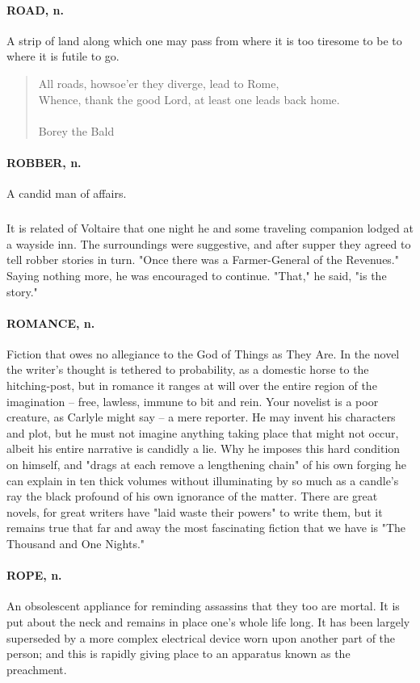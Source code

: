 \documentclass[11pt]{article}
\begin{document}
\paragraph{ROAD, n.}  A strip of land along which one may pass from where it is
too tiresome to be to where it is futile to go.

\begin{quote}   All roads, howsoe'er they diverge, lead to Rome, \\
  Whence, thank the good Lord, at least one leads back home. \\
 \\
Borey the Bald \end{quote}


\paragraph{ROBBER, n.}  A candid man of affairs.
\subparagraph{}   It is related of Voltaire that one night he and some traveling
companion lodged at a wayside inn.  The surroundings were suggestive,
and after supper they agreed to tell robber stories in turn.  "Once
there was a Farmer-General of the Revenues."  Saying nothing more, he
was encouraged to continue.  "That," he said, "is the story."

\paragraph{ROMANCE, n.}  Fiction that owes no allegiance to the God of Things as
They Are.  In the novel the writer's thought is tethered to
probability, as a domestic horse to the hitching-post, but in romance
it ranges at will over the entire region of the imagination -- free,
lawless, immune to bit and rein.  Your novelist is a poor creature, as
Carlyle might say -- a mere reporter.  He may invent his characters
and plot, but he must not imagine anything taking place that might not
occur, albeit his entire narrative is candidly a lie.  Why he imposes
this hard condition on himself, and "drags at each remove a
lengthening chain" of his own forging he can explain in ten thick
volumes without illuminating by so much as a candle's ray the black
profound of his own ignorance of the matter.  There are great novels,
for great writers have "laid waste their powers" to write them, but it
remains true that far and away the most fascinating fiction that we
have is "The Thousand and One Nights."

\paragraph{ROPE, n.}  An obsolescent appliance for reminding assassins that they
too are mortal.  It is put about the neck and remains in place one's
whole life long.  It has been largely superseded by a more complex
electrical device worn upon another part of the person; and this is
rapidly giving place to an apparatus known as the preachment.
\end{document}
